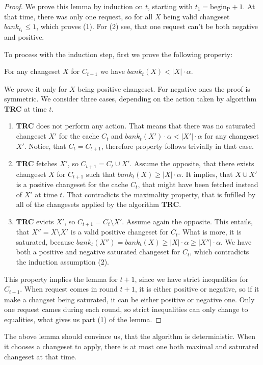 \begin{proof}
We prove this lemma by induction on $t$, starting with $t_1 = \mathrm{begin_P} 
+1$. At that time, there was only one request, so for all $X$ being valid changeset 
$bank_{t_1} \leq 1$, which proves (1). For (2) see, that one request can't be 
both negative and positive.

To process with the induction step, first we prove the following property:
\begin{property}
For any changeset $X$ for $C_{t+1}$ we have $bank_t(X) < |X| \cdot \alpha$.
\end{property}
We prove it only for $X$ being positive changeset. For negative ones the proof 
is symmetric. We consider three cases, depending on the action taken by 
algorithm \textbf{TRC} at time $t$.
\begin{enumerate}
 \item \textbf{TRC} does not perform any action. That means that there was no 
saturated changeset $X'$ for the cache $C_t$ and $bank_t(X') \cdot \alpha < |X'| \cdot 
\alpha$ for any changeset $X'$. Notice, that $C_t = C_{t+1}$, therefore property
follows trivially in that case.
  \item \textbf{TRC} fetches $X'$, so $C_{t+1} = C_t \cup X'$. Assume the 
opposite, that there exists changeset $X$ for $C_{t+1}$ such that $bank_t(X) 
\geq |X| \cdot \alpha$. It implies, that $X \cup X'$ is a positive changeset for 
the cache $C_t$, that might have been fetched instead of $X'$ at time $t$. That 
contradicts the maximality property, that is fufilled by all of the changesets 
applied by the algorithm \textbf{TRC}.
  \item \textbf{TRC} evicts $X'$, so $C_{t+1}  = C_t \setminus X'$. Assume 
again the opposite. This entails, that $X'' = X \setminus X'$ is a valid 
positive changeset for $C_t$. What is more, it is saturated, because $bank_t(X'') = 
bank_t(X) \geq |X| \cdot \alpha \geq |X''| \cdot \alpha$. We have both a positive 
and  negative saturated changeset for $C_t$, which contradicts the induction 
assumption (2).
\end{enumerate}
This property implies the lemma for $t+1$, since we have strict inequalities for 
$C_{t+1}$. When request comes in round $t+1$, it is either positive or negative, 
so if it make a changset being saturated, it can be either positive or negative one. 
Only one request cames during each round, so strict inequalities can only change 
to equalities, what gives us part (1) of the lemma.
\end{proof}
The above lemma should convince us, that the algorithm is deterministic. When it chooses 
a changeset to apply, there is at most one both maximal and saturated changeset at that 
time.

